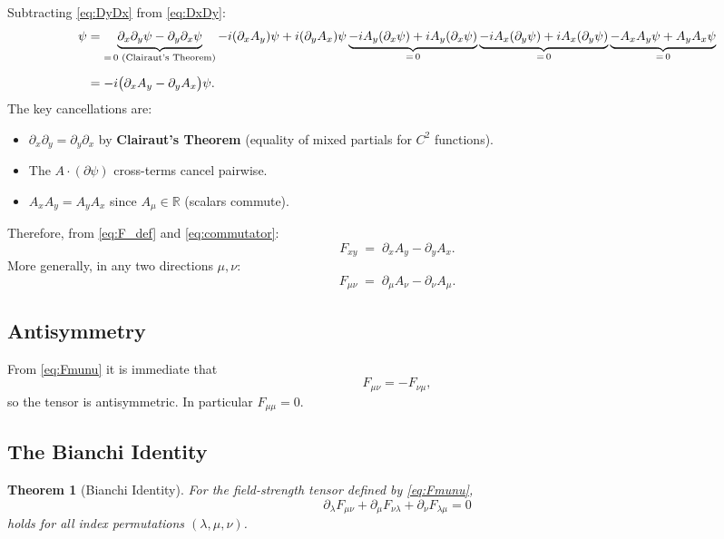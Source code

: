 \documentclass[12pt, a4paper]{article}
\theoremstyle{plain}
\newtheorem{theorem}{Theorem}[section]
\theoremstyle{definition}
\theoremstyle{remark}
\newcommand{\R}{\mathbb{R}}
\newcommand{\psifield}{\psi}
\begin{document}
Subtracting \eqref{eq:DyDx} from \eqref{eq:DxDy}:
\begin{align}
  [D_x, D_y]\psifield
  &= \underbrace{\partial_x\partial_y\psifield - \partial_y\partial_x\psifield}_{=\,0\text{ (Clairaut's Theorem)}}
     - i(\partial_x A_y)\psifield
     + i(\partial_y A_x)\psifield
     \underbrace{- i A_y(\partial_x\psifield) + i A_y(\partial_x\psifield)}_{=\,0}
     \underbrace{- i A_x(\partial_y\psifield) + i A_x(\partial_y\psifield)}_{=\,0}
     \underbrace{- A_xA_y\psifield + A_yA_x\psifield}_{=\,0} \notag\\[6pt]
  &= -i\bigl(\partial_x A_y - \partial_y A_x\bigr)\psifield.
  \label{eq:commutator}
\end{align}
The key cancellations are:
\begin{itemize}
  \item $\partial_x\partial_y = \partial_y\partial_x$ by \textbf{Clairaut's Theorem} (equality of mixed partials for $C^2$ functions).
  \item The $A\cdot(\partial\psifield)$ cross-terms cancel pairwise.
  \item $A_xA_y = A_yA_x$ since $A_\mu \in \R$ (scalars commute).
\end{itemize}

Therefore, from \eqref{eq:F_def} and \eqref{eq:commutator}:
\begin{equation}
  \boxed{F_{xy} \;=\; \partial_x A_y - \partial_y A_x.}
  \label{eq:Fxy}
\end{equation}
More generally, in any two directions $\mu, \nu$:
\begin{equation}
  F_{\mu\nu} \;=\; \partial_\mu A_\nu - \partial_\nu A_\mu.
  \label{eq:Fmunu}
\end{equation}

\subsection{Antisymmetry}

From \eqref{eq:Fmunu} it is immediate that
\[
  F_{\mu\nu} = -F_{\nu\mu},
\]
so the tensor is antisymmetric.  In particular $F_{\mu\mu} = 0$.

\subsection{The Bianchi Identity}

\begin{theorem}[Bianchi Identity]
\label{thm:bianchi}
For the field-strength tensor defined by \eqref{eq:Fmunu},
\begin{equation}
  \partial_\lambda F_{\mu\nu} + \partial_\mu F_{\nu\lambda} + \partial_\nu F_{\lambda\mu} = 0
  \label{eq:bianchi}
\end{equation}
holds for all index permutations $(\lambda,\mu,\nu)$.
\end{theorem}
\end{document}
